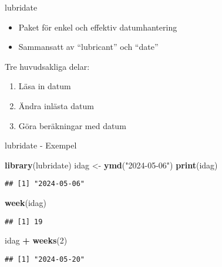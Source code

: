\documentclass[
  11pt,
  ignorenonframetext,
  handout]{beamer}
\newenvironment{Shaded}{\begin{snugshade}}{\end{snugshade}}
\newcommand{\DecValTok}[1]{\textcolor[rgb]{0.00,0.00,0.81}{#1}}
\newcommand{\FunctionTok}[1]{\textcolor[rgb]{0.13,0.29,0.53}{\textbf{#1}}}
\newcommand{\NormalTok}[1]{#1}
\newcommand{\OtherTok}[1]{\textcolor[rgb]{0.56,0.35,0.01}{#1}}
\newcommand{\SpecialCharTok}[1]{\textcolor[rgb]{0.81,0.36,0.00}{\textbf{#1}}}
\newcommand{\StringTok}[1]{\textcolor[rgb]{0.31,0.60,0.02}{#1}}
\providecommand{\tightlist}{%
  \setlength{\itemsep}{0pt}\setlength{\parskip}{0pt}}
\begin{document}
\begin{frame}{lubridate}
\label{lubridate}
\begin{itemize}
\tightlist
\item
  Paket för enkel och effektiv datumhantering
\item
  Sammansatt av ``lubricant'' och ``date''
\end{itemize}

Tre huvudsakliga delar:

\begin{enumerate}
\tightlist
\item
  Läsa in datum
\item
  Ändra inlästa datum
\item
  Göra beräkningar med datum
\end{enumerate}
\end{frame}

\begin{frame}[fragile]{lubridate - Exempel}
\label{lubridate---exempel}
\begin{Shaded}
\begin{Highlighting}[]
\FunctionTok{library}\NormalTok{(lubridate)}
\NormalTok{idag }\OtherTok{\textless{}{-}} \FunctionTok{ymd}\NormalTok{(}\StringTok{"2024{-}05{-}06"}\NormalTok{)}
\FunctionTok{print}\NormalTok{(idag)}
\end{Highlighting}
\end{Shaded}

\begin{verbatim}
## [1] "2024-05-06"
\end{verbatim}

\begin{Shaded}
\begin{Highlighting}[]
\FunctionTok{week}\NormalTok{(idag)}
\end{Highlighting}
\end{Shaded}

\begin{verbatim}
## [1] 19
\end{verbatim}

\begin{Shaded}
\begin{Highlighting}[]
\NormalTok{idag }\SpecialCharTok{+} \FunctionTok{weeks}\NormalTok{(}\DecValTok{2}\NormalTok{)}
\end{Highlighting}
\end{Shaded}

\begin{verbatim}
## [1] "2024-05-20"
\end{verbatim}
\end{frame}
\end{document}
